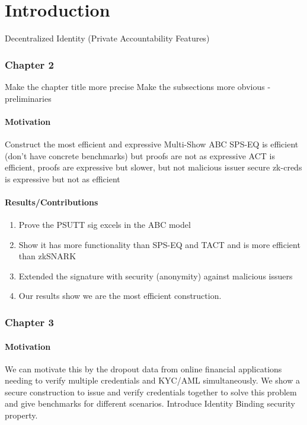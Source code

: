 \chapter{Introduction}
Decentralized Identity (Private Accountability Features)



\subsection{Chapter 2}
Make the chapter title more precise
Make the subsections more obvious - preliminaries 


\subsubsection{Motivation}
Construct the most efficient and expressive Multi-Show ABC
SPS-EQ is efficient (don't have concrete benchmarks) but proofs are not as expressive
ACT is efficient, proofs are expressive but slower, but not malicious issuer secure
zk-creds is expressive but not as efficient


\subsubsection{Results/Contributions}
\begin{enumerate}
    \item Prove the PSUTT sig excels in the ABC model
    \item Show it has more functionality than SPS-EQ and TACT and is more efficient than zkSNARK
    \item Extended the signature with security (anonymity) against malicious issuers
    \item Our results show we are the most efficient construction.
\end{enumerate}




\subsection{Chapter 3}
\subsubsection{Motivation}
We can motivate this by the dropout data from online financial applications needing to verify multiple credentials and KYC/AML simultaneously. 
We show a secure construction to issue and verify credentials together to solve this problem and give benchmarks for different scenarios.
Introduce Identity Binding security property.

